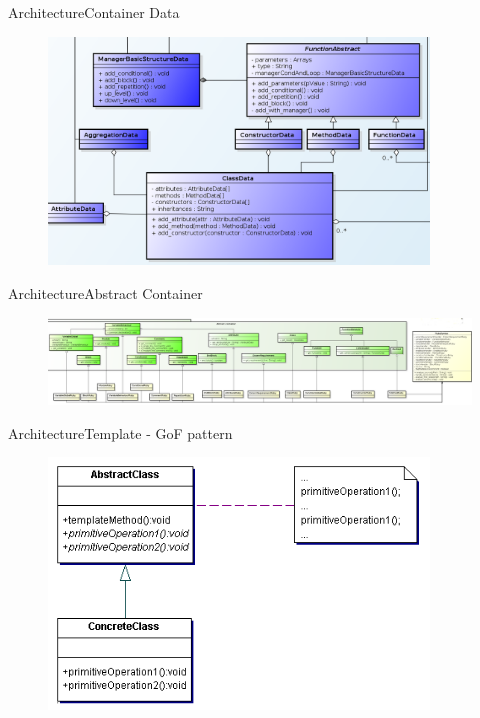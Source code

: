 \documentclass[10pt]{beamer}
\begin{document}
\begin{frame}{Architecture}{Container Data}
  \begin{figure}[overview]
    \includegraphics[width=0.9\textwidth]{images/functionBehaviour.png}
  \end{figure}
\end{frame}


\begin{frame}{Architecture}{Abstract Container}
  \begin{figure}[overview]
    \includegraphics[width=1\textwidth]{images/abstractContainer.png}
  \end{figure}
\end{frame}

\begin{frame}{Architecture}{Template - GoF pattern}
  \begin{figure}[stategof]
    \includegraphics[width=0.9\textwidth]{images/template.png}
  \end{figure}
\end{frame}
\end{document}
